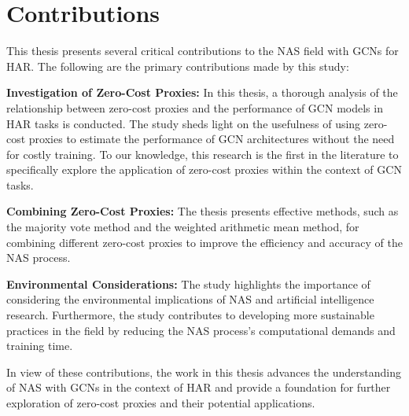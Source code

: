 \section{Contributions}

This thesis presents several critical contributions to the \gls{NAS} field with \glspl{GCN} for \gls{HAR}. The following are the primary contributions made by this study:

\textbf{Investigation of Zero-Cost Proxies:} In this thesis, a thorough analysis of the relationship between zero-cost proxies and the performance of \gls{GCN} models in \gls{HAR} tasks is conducted. The study sheds light on the usefulness of using zero-cost proxies to estimate the performance of \gls{GCN} architectures without the need for costly training. To our knowledge, this research is the first in the literature to specifically explore the application of zero-cost proxies within the context of \gls{GCN} tasks.

\textbf{Combining Zero-Cost Proxies:} The thesis presents effective methods, such as the majority vote method and the weighted arithmetic mean method, for combining different zero-cost proxies to improve the efficiency and accuracy of the \gls{NAS} process. 

\textbf{Environmental Considerations:} The study highlights the importance of considering the environmental implications of \gls{NAS} and artificial intelligence research. Furthermore, the study contributes to developing more sustainable practices in the field by reducing the \gls{NAS} process's computational demands and training time.

In view of these contributions, the work in this thesis advances the understanding of \gls{NAS} with \glspl{GCN} in the context of \gls{HAR} and provide a foundation for further exploration of zero-cost proxies and their potential applications.